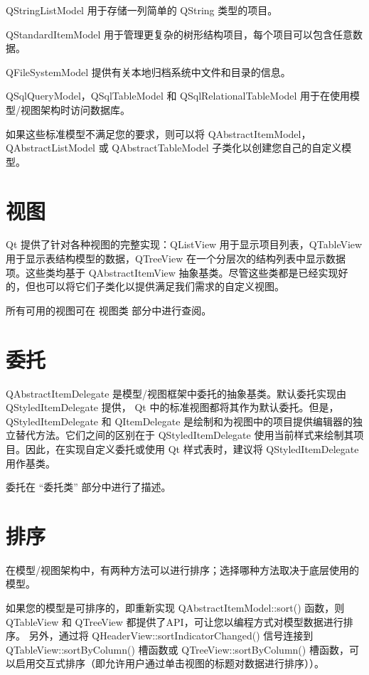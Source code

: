 \begin{compactitem}
\item QStringListModel 用于存储一列简单的 QString 类型的项目。
\item QStandardItemModel 用于管理更复杂的树形结构项目，每个项目可以包含任意数据。
\item QFileSystemModel 提供有关本地归档系统中文件和目录的信息。
\item QSqlQueryModel，QSqlTableModel 和 QSqlRelationalTableModel 用于在使用模型/视图架构时访问数据库。
\end{compactitem}


如果这些标准模型不满足您的要求，则可以将 QAbstractItemModel，QAbstractListModel 或 QAbstractTableModel 子类化以创建您自己的自定义模型。

\section{视图}

Qt 提供了针对各种视图的完整实现：QListView 用于显示项目列表，QTableView 用于显示表结构模型的数据，QTreeView 在一个分层次的结构列表中显示数据项。这些类均基于 QAbstractItemView 抽象基类。尽管这些类都是已经实现好的，但也可以将它们子类化以提供满足我们需求的自定义视图。


所有可用的视图可在 视图类 部分中进行查阅。

\section{委托}

QAbstractItemDelegate 是模型/视图框架中委托的抽象基类。默认委托实现由 QStyledItemDelegate 提供， Qt 中的标准视图都将其作为默认委托。但是，QStyledItemDelegate 和 QItemDelegate 是绘制和为视图中的项目提供编辑器的独立替代方法。它们之间的区别在于 QStyledItemDelegate 使用当前样式来绘制其项目。因此，在实现自定义委托或使用 Qt 样式表时，建议将 QStyledItemDelegate 用作基类。


委托在 “委托类” 部分中进行了描述。

\section{排序}

在模型/视图架构中，有两种方法可以进行排序；选择哪种方法取决于底层使用的模型。


如果您的模型是可排序的，即重新实现 QAbstractItemModel::sort() 函数，则 QTableView 和 QTreeView 都提供了API，可让您以编程方式对模型数据进行排序。 另外，通过将 QHeaderView::sortIndicatorChanged() 信号连接到 QTableView::sortByColumn() 槽函数或 QTreeView::sortByColumn() 槽函数，可以启用交互式排序（即允许用户通过单击视图的标题对数据进行排序））。


